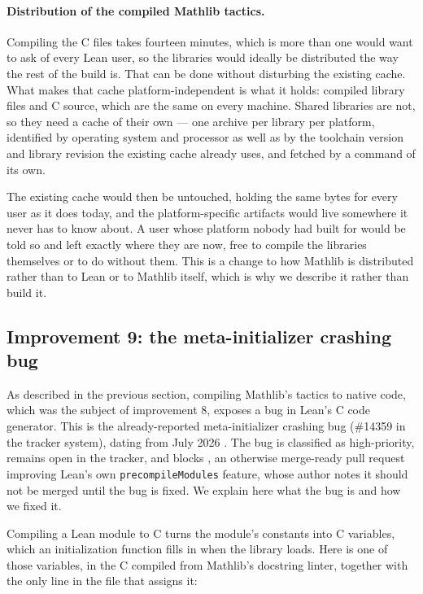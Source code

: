 \documentclass{article}
\newcommand{\Lean}{Lean\xspace}      %
\newcommand{\mathlib}{Mathlib\xspace}
\begin{document}
\paragraph{Distribution of the compiled \mathlib tactics.}
Compiling the C files takes fourteen minutes, which is more than one would want to ask of every \Lean user, so the libraries would ideally be distributed the way the rest of the build is. That can be done without disturbing the existing cache. What makes that cache platform-independent is what it holds: compiled library files and C source, which are the same on every machine. Shared libraries are not, so they need a cache of their own --- one archive per library per platform, identified by operating system and processor as well as by the toolchain version and library revision the existing cache already uses, and fetched by a command of its own.

The existing cache would then be untouched, holding the same bytes for every user as it does today, and the platform-specific artifacts would live somewhere it never has to know about. A user whose platform nobody had built for would be told so and left exactly where they are now, free to compile the libraries themselves or to do without them. This is a change to how \mathlib is distributed rather than to \Lean or to \mathlib itself, which is why we describe it rather than build it.

\subsection{Improvement 9: the meta-initializer crashing bug}
\label{sec:tn-9}

As described in the previous section, compiling \mathlib's tactics to native code, which was the subject of improvement 8, exposes a bug in \Lean's C code generator. This is the already-reported meta-initializer crashing bug (\#14359 in the tracker system), dating from July 2026 \cite{lean14359}. 
The bug is classified as high-priority, remains open in the tracker, and blocks \cite{lean14326}, an otherwise merge-ready pull request improving \Lean's own \texttt{precompileModules} feature, whose author notes it should not be merged until the bug is fixed. We explain here what the bug is and how we fixed it.

Compiling a \Lean module to C turns the module's constants into C variables, which an initialization function fills in when the library loads. Here is one of those variables, in the C compiled from \mathlib's docstring linter, together with the only line in the file that assigns it:
\end{document}
